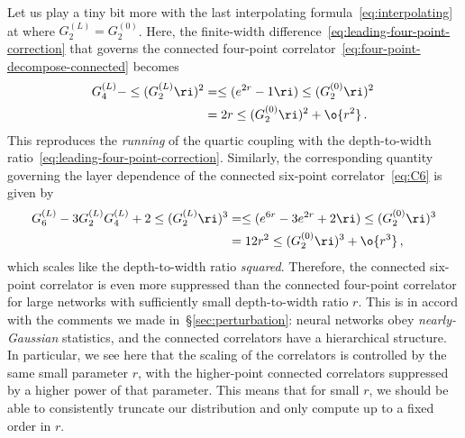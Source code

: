 Let us play a tiny bit more with the last interpolating formula~\eqref{eq:interpolating} at 
where $G_{2}^{(L)}=G_{2}^{(0)}$.
Here, the finite-width difference~\eqref{eq:leading-four-point-correction} that governs the connected four-point correlator~\eqref{eq:four-point-decompose-connected} becomes
\begin{align}
G_{4}^{(L)}-\le(G_{2}^{(L)}\ri)^2&=\le(e^{2r}-1\ri)\le(G_{2}^{(0)}\ri)^2\, \\
&=2r \le(G_{2}^{(0)}\ri)^2+\o{r^2}\, . \notag
\end{align}
This reproduces the \emph{running} of the quartic coupling with the depth-to-width ratio~\eqref{eq:leading-four-point-correction}. Similarly,
the corresponding quantity governing the layer dependence of the connected six-point correlator~\eqref{eq:C6} is given by
\begin{align}
G_{6}^{(L)}-3G_{2}^{(L)}G_{4}^{(L)}+2\le(G_{2}^{(L)}\ri)^3&=\le(e^{6r}-3e^{2r}+2\ri)\le(G_{2}^{(0)}\ri)^3\\
&=12r^2 \le(G_{2}^{(0)}\ri)^3 +\o{r^3}\, , \notag
\end{align}
which scales like the depth-to-width ratio \emph{squared}. Therefore, the connected six-point correlator is even more suppressed than the connected four-point correlator for large networks with sufficiently small depth-to-width ratio $r$. This is in accord with the comments we made in~\S\ref{sec:perturbation}: neural networks obey \emph{nearly-Gaussian} statistics, and
the connected correlators 
have a hierarchical structure. In particular, we see here that the scaling of the correlators is controlled by the same small parameter $r$,  with the higher-point connected correlators suppressed by a higher power of that parameter. This means that for small $r$, we should be able to consistently truncate our distribution and only compute up to a fixed order in $r$.






 
 
























